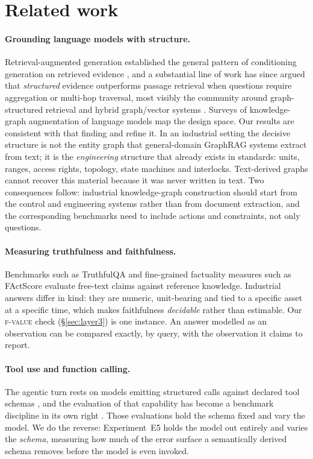 \section{Related work}
\label{sec:related}

\paragraph{Grounding language models with structure.} Retrieval-augmented
generation established the general pattern of conditioning generation on
retrieved evidence \cite{lewis2020rag}, and a substantial line of work has since
argued that \emph{structured} evidence outperforms passage retrieval when
questions require aggregation or multi-hop traversal, most visibly the
community around graph-structured retrieval \cite{edge2024graphrag} and hybrid
graph/vector systems \cite{sarmah2024hybridrag}. Surveys of knowledge-graph
augmentation of language models \cite{pan2024unifying} map the design space.
Our results are consistent with that finding and refine it. In an industrial
setting the decisive structure is not the entity graph that general-domain
GraphRAG systems extract from text; it is the \emph{engineering} structure that
already exists in standards: units, ranges, access rights, topology, state
machines and interlocks. Text-derived graphs cannot recover this material
because it was never written in text. Two consequences follow: industrial knowledge-graph
construction should start from the control and engineering systems rather than
from document extraction, and the corresponding benchmarks need to include
actions and constraints, not only questions.

\paragraph{Measuring truthfulness and faithfulness.} Benchmarks such as
TruthfulQA \cite{lin2022truthfulqa} and fine-grained factuality measures such as
FActScore \cite{min2023factscore} evaluate free-text claims against reference
knowledge. Industrial answers differ in kind: they are numeric, unit-bearing and
tied to a specific asset at a specific time, which makes faithfulness
\emph{decidable} rather than estimable. Our \textsc{f-value} check
(\S\ref{sec:layer3}) is one instance. An answer modelled as an observation can
be compared exactly, by query, with the observation it claims to report.

\paragraph{Tool use and function calling.} The agentic turn rests on models
emitting structured calls against declared tool schemas
\cite{schick2023toolformer,yao2023react}, and the evaluation of that capability
has become a benchmark discipline in its own right \cite{patil2024gorilla}.
Those evaluations hold the schema fixed and vary the model. We do the reverse:
Experiment~E5 holds the model out entirely and varies the \emph{schema},
measuring how much of the error surface a semantically derived schema removes
before the model is even invoked.

